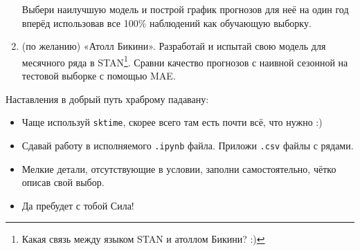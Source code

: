\documentclass[12pt]{article}
\begin{document}
\begin{enumerate}
    Выбери наилучшую модель и построй график прогнозов для неё на один год вперёд использовав все 100\% наблюдений как обучающую выборку.


    \item (по желанию) «Атолл Бикини». Разработай и испытай свою модель для месячного ряда в STAN\footnote{Какая связь между языком STAN и атоллом Бикини? :)}.
    Сравни качество прогнозов с наивной сезонной на тестовой выборке с помощью MAE. 
    


\end{enumerate}

Наставления в добрый путь храброму падавану:
\begin{itemize}
    \item Чаще используй \verb|sktime|, скорее всего там есть почти всё, что нужно :)
    \item Сдавай работу в исполняемого \verb|.ipynb| файла. Приложи \verb|.csv| файлы с рядами. 
    \item Мелкие детали, отсутствующие в условии, заполни самостоятельно, чётко описав свой выбор.
    \item Да пребудет с тобой Сила!
\end{itemize}
\end{document}
